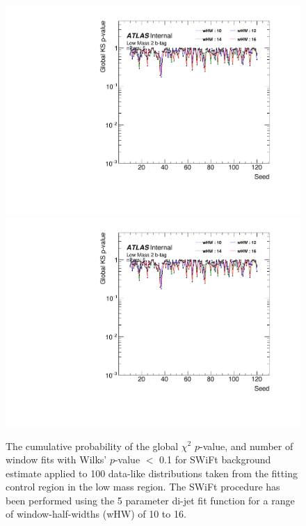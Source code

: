 \begin{figure}[!htb]
\captionsetup[subfigure]{aboveskip=0pt,justification=centering}
\centering
{} {
  \includegraphics[width=0.45\linewidth, angle=0,page=7]{figs/Dibjet/LowMass/FitStudy/windowSel_corrFitCR_dataLike_5para.pdf}
}%
 {
  \includegraphics[width=0.45\linewidth, angle=0,page=9]{figs/Dibjet/LowMass/FitStudy/windowSel_corrFitCR_dataLike_5para.pdf}
}
\vspace{10pt}
\caption{\label{fig:windowSel_dataLike}
  The cumulative probability of the global $\chi^{2}$ $p$-value, %
  and number of window fits with Wilks' $p$-value $<$ 0.1 for SWiFt background estimate
  applied to 100 data-like distributions taken from the fitting control region in the low mass region.
  The SWiFt procedure has been performed using the 5 parameter di-jet fit function
  for a range of window-half-widths (wHW) of 10 to 16.
}
\end{figure}

